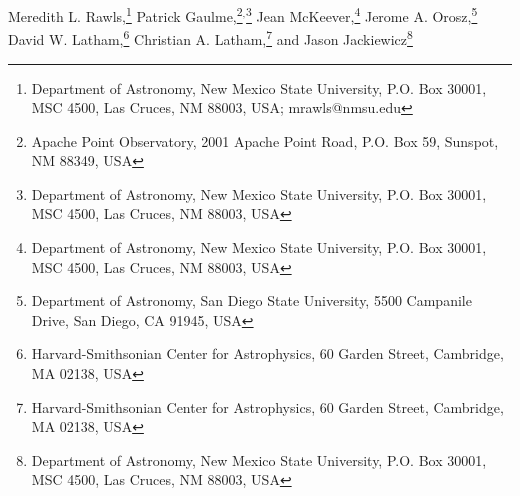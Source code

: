 
Meredith L. Rawls,\footnote{Department of Astronomy, New Mexico State University, P.O. Box 30001, MSC 4500, Las Cruces, NM 88003, USA; mrawls@nmsu.edu}
\setcounter{footnote}{1}
Patrick Gaulme,\footnote{Apache Point Observatory, 2001 Apache Point Road, P.O. Box 59, Sunspot, NM 88349, USA}\setcounter{footnote}{0}$^{,}$\footnote{Department of Astronomy, New Mexico State University, P.O. Box 30001, MSC 4500, Las Cruces, NM 88003, USA}
\setcounter{footnote}{0}
Jean McKeever,\footnote{Department of Astronomy, New Mexico State University, P.O. Box 30001, MSC 4500, Las Cruces, NM 88003, USA}
\setcounter{footnote}{2}
Jerome A. Orosz,\footnote{Department of Astronomy, San Diego State University, 5500 Campanile Drive, San Diego, CA 91945, USA}
David W. Latham,\footnote{Harvard-Smithsonian Center for Astrophysics, 60 Garden Street, Cambridge, MA 02138, USA}
\setcounter{footnote}{3}
Christian A. Latham,\footnote{Harvard-Smithsonian Center for Astrophysics, 60 Garden Street, Cambridge, MA 02138, USA} and 
\setcounter{footnote}{0}
Jason Jackiewicz\footnote{Department of Astronomy, New Mexico State University, P.O. Box 30001, MSC 4500, Las Cruces, NM 88003, USA}

  
  